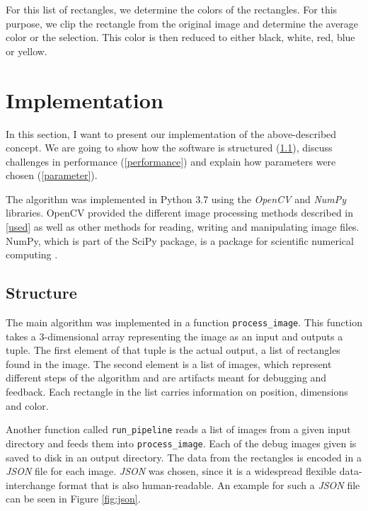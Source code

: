 \documentclass[serif,article,noparskip]{agse-thesis}
\begin{document}
For this list of rectangles, we determine the colors of the rectangles. For this
purpose, we clip the rectangle from the original image and determine the average
color or the selection. This color is then reduced to either black, white, red,
blue or yellow.

\section{Implementation} \label{implementation}

In this section, I want to present our implementation of the above-described
concept. We are going to show how the software is structured
(\ref{structure}), discuss challenges in performance (\ref{performance}) and
explain how parameters were chosen (\ref{parameter}).

The algorithm was implemented in Python 3.7 using the \textit{OpenCV} and
\textit{NumPy} libraries. OpenCV provided the different image processing methods
described in \ref{used} as well as other methods for reading, writing and
manipulating image files. NumPy, which is part of the SciPy package, is a
package for scientific numerical computing \cite{scipy}.

\subsection{Structure} \label{structure}

The main algorithm was implemented in a function \texttt{process\_image}. This
function takes a 3-dimensional array representing the image as an input and
outputs a tuple. The first element of that tuple is the actual output, a list of
rectangles found in the image. The second element is a list of images, which
represent different steps of the algorithm and are artifacts meant for debugging
and feedback. Each rectangle in the list carries information on position, dimensions
and color.


Another function called \texttt{run\_pipeline} reads a list of images from a
given input directory and feeds them into \texttt{process\_image}. Each of the
debug images given is saved to disk in an output directory. The data from the
rectangles is encoded in a \textit{JSON} file for each image. \textit{JSON} was
chosen, since it is a widespread flexible data-interchange format that is also
human-readable. An example for such a \textit{JSON} file can be seen in Figure
\ref{fig:json}.
\end{document}
